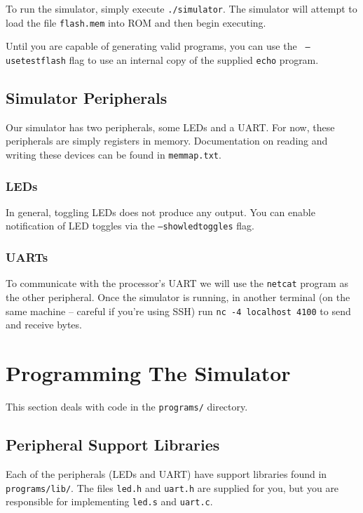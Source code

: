 \documentclass{article}
\begin{document}
To run the simulator, simply execute {\tt ./simulator}. The simulator will
attempt to load the file {\tt flash.mem} into ROM and then begin executing.

Until you are capable of generating valid programs, you can use the {\tt
--usetestflash} flag to use an internal copy of the supplied {\tt echo}
program.

\subsection{Simulator Peripherals}

Our simulator has two peripherals, some LEDs and a UART. For now, these
peripherals are simply registers in memory. Documentation on reading and
writing these devices can be found in {\tt memmap.txt}.

\subsubsection{LEDs}

In general, toggling LEDs does not produce any output. You can enable
notification of LED toggles via the {\tt --showledtoggles} flag.

\subsubsection{UARTs}

To communicate with the processor's UART we will use the {\tt netcat} program
as the other peripheral. Once the simulator is running, in another terminal
(on the same machine -- careful if you're using SSH) run {\tt nc -4 localhost
4100} to send and receive bytes.

\section{Programming The Simulator}

This section deals with code in the {\tt programs/} directory.

\subsection{Peripheral Support Libraries}

Each of the peripherals (LEDs and UART) have support libraries found in {\tt
programs/lib/}. The files {\tt led.h} and {\tt uart.h} are supplied for you,
but you are responsible for implementing {\tt led.s} and {\tt uart.c}.
\end{document}
